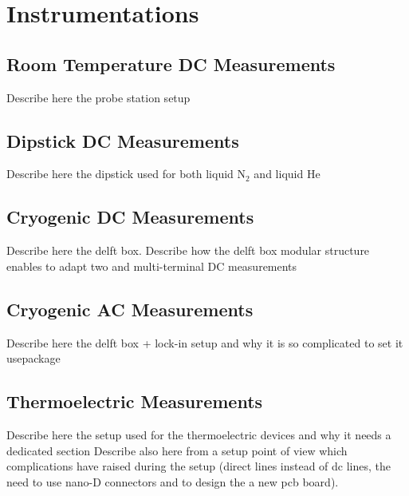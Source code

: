 \chapter{\label{ch:instrumentations}Instrumentations}

\minitoc

\section{Room Temperature DC Measurements}

Describe here the probe station setup

\section{Dipstick DC Measurements}

Describe here the dipstick used for both liquid N$_2$ and liquid He

\section{Cryogenic DC Measurements}

Describe here the delft box. Describe how the delft box modular structure enables to adapt two and multi-terminal DC measurements

\section{Cryogenic AC Measurements}

Describe here the delft box + lock-in setup and why it is so complicated to set it usepackage

\section{Thermoelectric Measurements}

Describe here the setup used for the thermoelectric devices and why it needs a dedicated section
Describe also here from a setup point of view which complications have raised during the setup (direct lines instead of dc lines,
the need to use nano-D connectors and to design the a new pcb board).


